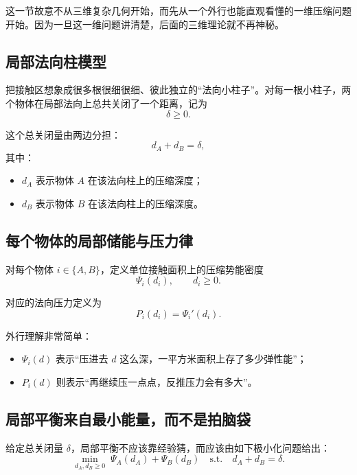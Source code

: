 \documentclass[12pt,a4paper]{ctexart}
\begin{document}
这一节故意不从三维复杂几何开始，而先从一个外行也能直观看懂的一维压缩问题开始。因为一旦这一维问题讲清楚，后面的三维理论就不再神秘。

\subsection{局部法向柱模型}
把接触区想象成很多根很细很细、彼此独立的“法向小柱子”。对每一根小柱子，两个物体在局部法向上总共关闭了一个距离，记为
\begin{equation}
    \delta \ge 0.
\end{equation}

这个总关闭量由两边分担：
\begin{equation}
    d_A + d_B = \delta,
\end{equation}
其中：
\begin{itemize}
    \item $d_A$ 表示物体 $A$ 在该法向柱上的压缩深度；
    \item $d_B$ 表示物体 $B$ 在该法向柱上的压缩深度。
\end{itemize}

\subsection{每个物体的局部储能与压力律}
对每个物体 $i\in\{A,B\}$，定义单位接触面积上的压缩势能密度
\begin{equation}
    \Psi_i(d_i), \qquad d_i\ge 0.
\end{equation}

对应的法向压力定义为
\begin{equation}
    P_i(d_i)=\Psi_i'(d_i).
\end{equation}

外行理解非常简单：
\begin{itemize}
    \item $\Psi_i(d)$ 表示“压进去 $d$ 这么深，一平方米面积上存了多少弹性能”；
    \item $P_i(d)$ 则表示“再继续压一点点，反推压力会有多大”。
\end{itemize}

\subsection{局部平衡来自最小能量，而不是拍脑袋}
给定总关闭量 $\delta$，局部平衡不应该靠经验猜，而应该由如下极小化问题给出：
\begin{equation}
    \min_{d_A,d_B\ge 0}\; \Psi_A(d_A)+\Psi_B(d_B)
    \quad\text{s.t.}\quad d_A+d_B=\delta.
\end{equation}
\end{document}
